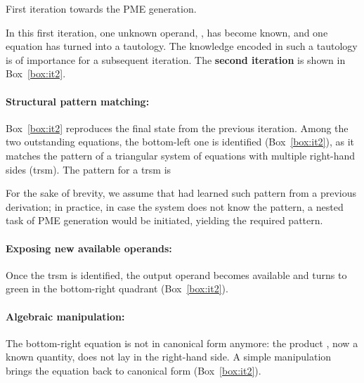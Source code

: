 \documentclass{llncs}
\newcommand{\click}{{\sc{Cl\makebox[.58\width][c]{1}ck}}}
\begin{document}
\begin{mybox}
{\begin{mybox}
{\begin{minipage}{5.9cm}
  \end{minipage}
}
\caption{First iteration towards the PME generation.} \label{box:it1}
\end{mybox}


In this first iteration, one unknown operand, , has become known, 
and one equation has turned into a tautology.
The knowledge encoded in such a tautology is of importance for a subsequent iteration.
The {\bf second iteration} is shown in Box~\ref{box:it2}.

\paragraph{\bf Structural pattern matching:} 
Box~\ref{box:it2}
reproduces
the final state from the previous iteration.
Among the two outstanding equations,
the bottom-left one is identified (Box~\ref{box:it2}),
as it matches the pattern 
of a triangular system of equations with multiple right-hand sides ({\sc trsm}).
The pattern for a {\sc trsm} is

For the sake of brevity,
we assume that \click{}
had learned such pattern from a previous derivation; 
in practice, in case the system does not know the pattern,
a nested task of PME generation would be initiated, 
yielding the required pattern.

\paragraph{\bf Exposing new available operands:} 
Once the {\sc trsm} is identified, the output operand  becomes
available and turns to green in the bottom-right quadrant
(Box~\ref{box:it2}).

\paragraph{\bf Algebraic manipulation:} 
The bottom-right equation is not in canonical form anymore:
the product , now a known quantity,
does not lay in the right-hand side. A simple manipulation
brings the equation back to canonical form (Box~\ref{box:it2}).

\begin{mybox} \centering
\tiny
\renewcommand{\arraystretch}{1.6}
\hspace{-.2cm}
\end{mybox}}
\end{mybox}
\end{document}
